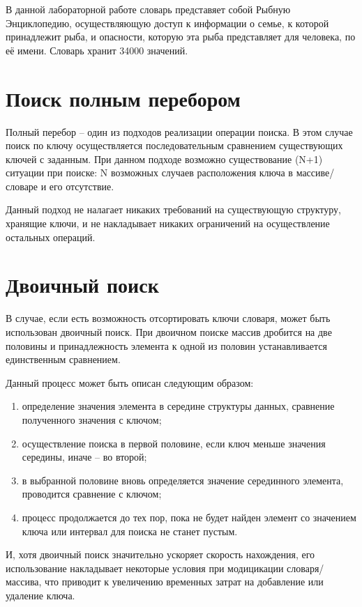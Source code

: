 \documentclass[a4paper,oneside,14pt]{extreport}
\begin{document}
В данной лабораторной работе словарь представяет собой Рыбную Энциклопедию, осуществляющую доступ к информации о семье, к которой принадлежит рыба, и опасности, которую эта рыба представляет для человека, по её имени. Словарь хранит 34000 значений.

\section{Поиск полным перебором}
Полный перебор -- один из подходов реализации операции поиска. В этом случае поиск по ключу осуществляется последовательным сравнением существующих ключей с заданным. При данном подходе возможно существование (N+1) ситуации при поиске: N возможных случаев расположения ключа в массиве/словаре и его отсутствие.\par
Данный подход не налагает никаких требований на существующую структуру, хранящие ключи, и не накладывает никаких ограничений на осуществление остальных операций.

\section{Двоичный поиск}
В случае, если есть возможность отсортировать ключи словаря, может быть использован двоичный поиск. При двоичном поиске массив дробится на две половины и принадлежность элемента к одной из половин устанавливается единственным сравнением.\par
Данный процесс может быть описан следующим образом:
\restoregeometry
\begin{enumerate}
	\item определение значения элемента в середине структуры данных, сравнение полученного значения с ключом;
	\item осуществление поиска в первой половине, если ключ меньше значения середины, иначе -- во второй;
	\item в выбранной половине  вновь определяется значение серединного элемента, проводится сравнение с ключом;
	\item процесс продолжается до тех пор, пока не будет найден элемент со значением ключа или интервал для поиска не станет пустым.
\end{enumerate}\par
И, хотя двоичный поиск значительно ускоряет скорость нахождения, его использование накладывает некоторые условия при модицикации словаря/массива, что приводит к увеличению временных затрат на добавление или удаление ключа.
\end{document}
